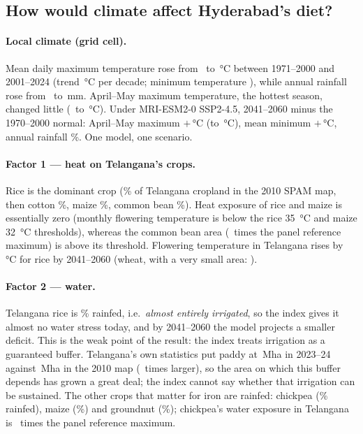 \subsection{How would climate affect Hyderabad's diet?}
\paragraph{Local climate (grid cell).} Mean daily maximum temperature rose from \hydTmaxBase\ to
\hydTmaxRecent\,\si{\celsius} between 1971--2000 and 2001--2024 (trend \hydTmaxTrend\,\si{\celsius} per decade;
minimum temperature \hydTminTrend), while annual rainfall rose from \hydRainBase\ to \hydRainRecent\,mm. April--May
maximum temperature, the hottest season, changed little (\hydAMBase\ to \hydAMRecent\,\si{\celsius}). Under
MRI-ESM2-0 SSP2-4.5, 2041--2060 minus the 1970--2000 normal: April--May maximum $+$\hydAMFutChange\,\si{\celsius}
(to \hydAMFutLevel\,\si{\celsius}), mean minimum $+$\hydTminFutChange\,\si{\celsius}, annual rainfall \hydRainFutRatio\%.
One model, one scenario.

\paragraph{Factor 1 --- heat on Telangana's crops.} Rice is the dominant crop (\tgAreaRice\% of Telangana
cropland in the 2010 SPAM map, then cotton \tgAreaCotton\%, maize \tgAreaMaize\%, common bean \tgAreaBean\%).
Heat exposure of rice and maize is essentially zero (monthly flowering temperature is below the rice
\SI{35}{\celsius} and maize \SI{32}{\celsius} thresholds), whereas the common bean area (\tgBeanEheatTwoZeroZeroOneTwoZeroTwoFour\ times the panel reference maximum)
is above its threshold. Flowering temperature in Telangana rises by \tgRicedTefffutureC\,\si{\celsius} for
rice by 2041--2060 (wheat, with a very small area: \tgWheatdTefffutureC).

\paragraph{Factor 2 --- water.} Telangana rice is \tgRiceRainfed\% rainfed, i.e.\ \emph{almost entirely
irrigated}, so the index gives it almost no water stress today, and by 2041--2060 the model projects a smaller
deficit. This is the weak point of the result: the index treats irrigation as a guaranteed buffer. Telangana's
own statistics put paddy at \tgPaddyAreaMha\,Mha in 2023--24 against \tgPaddySpamMha\,Mha in the 2010 map
(\tgPaddyGrowth\ times larger), so the area on which this buffer depends has grown a great deal; the index
cannot say whether that irrigation can be sustained. The other crops that matter for iron are rainfed:
chickpea (\tgChickpeaRainfed\% rainfed), maize (\tgMaizeRainfed\%) and groundnut (\tgGroundnutRainfed\%); chickpea's
water exposure in Telangana is \tgChickpeaEwaterTwoZeroZeroOneTwoZeroTwoFour\ times the panel reference maximum.

